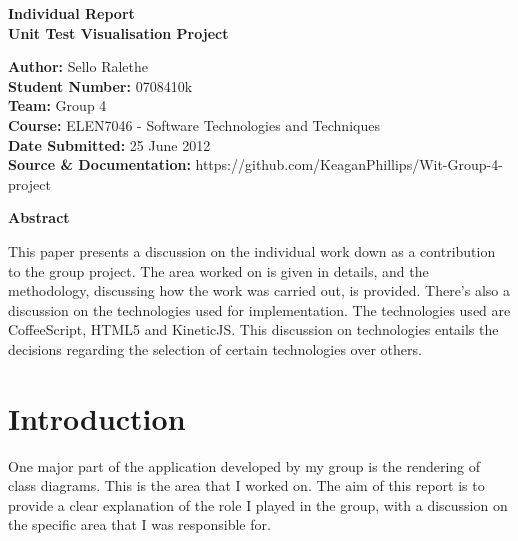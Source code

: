 \documentclass[a4paper,12pt]{article}
\begin{document}
\begin{center}
\begin{Huge}
\textbf{{\LARGE Individual Report \\ Unit Test Visualisation Project }}
\linebreak
\linebreak
\linebreak
\linebreak
\end{Huge}\end{center}




\begin{small}
\begin{flushleft}
\textbf{Author:} Sello Ralethe
\\
\textbf{Student Number:} 0708410k
\\
\textbf{Team:} Group 4
\\
\textbf{Course:} ELEN7046 - Software Technologies and Techniques
\\
\textbf{Date Submitted:} 25 June 2012
\\
\textbf{Source \& Documentation:} https://github.com/KeaganPhillips/Wit-Group-4-project
\linebreak
\linebreak
\linebreak
\linebreak
\linebreak
\end{flushleft}

\end{small}


\begin{flushleft}
\textbf{{\large Abstract}}
\end{flushleft}
This paper presents a discussion on the individual work down as a contribution to the group project. The area worked on is given in details, and the methodology, discussing how the work was carried out, is provided. There's also a discussion on the technologies used for implementation. The technologies used are CoffeeScript, HTML5 and KineticJS. This discussion on technologies entails the decisions regarding the selection of certain technologies over others.    
\clearpage


\tableofcontents


\clearpage

\section{Introduction}
One major part of the application developed by my group is the rendering of class diagrams. This is the area that I worked on. The aim of this report is to provide a clear explanation of the role I played in the group, with a discussion on the specific area that I was responsible for. \\
\end{document}
